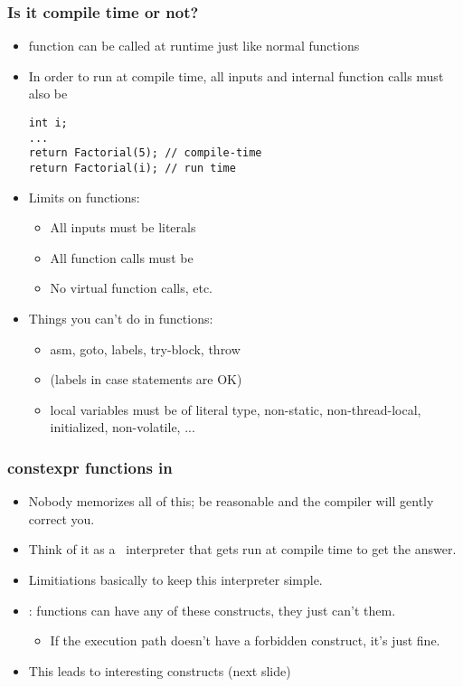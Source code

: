 \begin{frame}[fragile,t]
\frametitle{Is it compile time or not?}
\begin{itemize}[<+->]
\item \cexpr function can be called at runtime just like
  normal functions
\item In order to run at compile time, all inputs and internal
  function calls must also be \cexpr
{\scriptsize\begin{verbatim}
int i;
...
return Factorial(5); // compile-time
return Factorial(i); // run time
\end{verbatim}
}
\item Limits on \cexpr functions:
  \begin{itemize}
    \item All inputs must be literals
    \item All function calls must be \cexpr
    \item No virtual function calls, etc.
  \end{itemize}
\item Things you can't do in  \cexpr functions:
  \begin{itemize}
  \item asm, goto, labels, try-block, throw
    \item (labels in case statements are OK)
    \item local variables must be of literal type, non-static,
      non-thread-local, initialized, non-volatile, ...
  \end{itemize}
\end{itemize}
\end{frame}

\begin{frame}[fragile,t]
\frametitle{constexpr functions in }
\pause
\begin{itemize}[<+->]

\item Nobody memorizes all of this; be reasonable and the compiler
  will gently correct you.
\item Think of it as a \CC\ interpreter that gets run at compile time
  to get the answer.
\item Limitiations basically to keep this interpreter simple.
\item {}: \cexpr functions can have any of these
  constructs, they just can't  them.  
  \begin{itemize}
    \item If the execution path doesn't have a forbidden construct,
      it's just fine.
  \end{itemize}
\item This leads to interesting constructs (next slide)
\end{itemize}


\end{frame}



